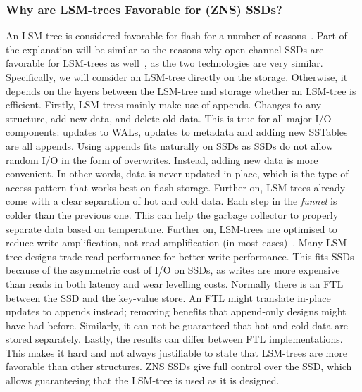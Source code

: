 \subsubsection{Why are LSM-trees Favorable for (ZNS) SSDs?}
An LSM-tree is considered favorable for flash for a number of reasons~\cite{purandareappend, stavrinos2021don}. Part of the explanation will be similar to the reasons why open-channel SSDs are favorable for LSM-trees as well~\cite{zhang2017flashkv}, as the two technologies are very similar. Specifically, we will consider an LSM-tree directly on the storage. Otherwise, it depends on the layers between the LSM-tree and storage whether an LSM-tree is efficient. Firstly, LSM-trees mainly make use of appends. Changes to any structure, add new data, and delete old data. This is true for all major I/O components: updates to WALs, updates to metadata and adding new SSTables are all appends. Using appends fits naturally on SSDs as SSDs do not allow random I/O in the form of overwrites. Instead, adding new data is more convenient. In other words, data is never updated in place, which is the type of access pattern that works best on flash storage. Further on, LSM-trees already come with a clear separation of hot and cold data. Each step in the \textit{funnel} is colder than the previous one. This can help the garbage collector to properly separate data based on temperature. Further on, LSM-trees are optimised to reduce write amplification, not read amplification (in most cases)~\cite{lu2017wisckey, liu2021ptierdb, mei2018sifrdb}. Many LSM-tree designs trade read performance for better write performance. This fits SSDs because of the asymmetric cost of I/O on SSDs, as writes are more expensive than reads in both latency and wear levelling costs. Normally there is an FTL between the SSD and the key-value store. An FTL might translate in-place updates to appends instead; removing benefits that append-only designs might have had before. Similarly, it can not be guaranteed that hot and cold data are stored separately. Lastly, the results can differ between FTL implementations. This makes it hard and not always justifiable to state that LSM-trees are more favorable than other structures. ZNS SSDs give full control over the SSD, which allows guaranteeing that the LSM-tree is used as it is designed.

